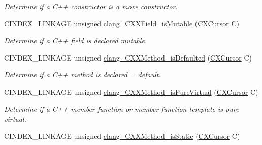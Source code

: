 \begin{DoxyCompactItemize}
\begin{DoxyCompactList}\small\item\em Determine if a C++ constructor is a move constructor. \end{DoxyCompactList}\item 
\mbox{\label{group__CINDEX__CPP_ga139bb12b60cd1ee472c6617f84691463}} 
C\+I\+N\+D\+E\+X\+\_\+\+L\+I\+N\+K\+A\+GE unsigned \mbox{\hyperlink{group__CINDEX__CPP_ga139bb12b60cd1ee472c6617f84691463}{clang\+\_\+\+C\+X\+X\+Field\+\_\+is\+Mutable}} (\mbox{\hyperlink{structCXCursor}{C\+X\+Cursor}} C)
\begin{DoxyCompactList}\small\item\em Determine if a C++ field is declared \textquotesingle{}mutable\textquotesingle{}. \end{DoxyCompactList}\item 
\mbox{\label{group__CINDEX__CPP_gaa9a2e7ae6d70db44f385ef1a0e49b4e5}} 
C\+I\+N\+D\+E\+X\+\_\+\+L\+I\+N\+K\+A\+GE unsigned \mbox{\hyperlink{group__CINDEX__CPP_gaa9a2e7ae6d70db44f385ef1a0e49b4e5}{clang\+\_\+\+C\+X\+X\+Method\+\_\+is\+Defaulted}} (\mbox{\hyperlink{structCXCursor}{C\+X\+Cursor}} C)
\begin{DoxyCompactList}\small\item\em Determine if a C++ method is declared \textquotesingle{}= default\textquotesingle{}. \end{DoxyCompactList}\item 
\mbox{\label{group__CINDEX__CPP_ga27e62c66c6dde438a114c4d6f93b5d9d}} 
C\+I\+N\+D\+E\+X\+\_\+\+L\+I\+N\+K\+A\+GE unsigned \mbox{\hyperlink{group__CINDEX__CPP_ga27e62c66c6dde438a114c4d6f93b5d9d}{clang\+\_\+\+C\+X\+X\+Method\+\_\+is\+Pure\+Virtual}} (\mbox{\hyperlink{structCXCursor}{C\+X\+Cursor}} C)
\begin{DoxyCompactList}\small\item\em Determine if a C++ member function or member function template is pure virtual. \end{DoxyCompactList}\item 
\mbox{\label{group__CINDEX__CPP_ga0362e1cf8957f59cc2803456ac2cbc45}} 
C\+I\+N\+D\+E\+X\+\_\+\+L\+I\+N\+K\+A\+GE unsigned \mbox{\hyperlink{group__CINDEX__CPP_ga0362e1cf8957f59cc2803456ac2cbc45}{clang\+\_\+\+C\+X\+X\+Method\+\_\+is\+Static}} (\mbox{\hyperlink{structCXCursor}{C\+X\+Cursor}} C)

\end{DoxyCompactItemize}
